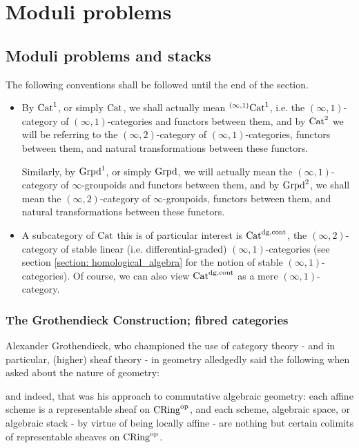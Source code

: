 \chapter{Moduli problems}
    \begin{abstract}
        
    \end{abstract}
    
    \minitoc
    
    \section{Moduli problems and stacks} \label{section: moduli_problems}
        The following conventions shall be followed until the end of the section.
        \begin{convention}
            \noindent
            \begin{itemize}
                \item By $\mathrm{Cat}^1$, or simply $\mathrm{Cat}$, we shall actually mean ${}^{(\infty, 1)}\mathrm{Cat}^1$, i.e. the $(\infty, 1)$-category of $(\infty, 1)$-categories and functors between them, and by $\mathrm{Cat}^2$ we will be referring to the $(\infty, 2)$-category of $(\infty, 1)$-categories, functors between them, and natural transformations between these functors. 
                
                Similarly, by $\mathrm{Grpd}^1$, or simply $\mathrm{Grpd}$, we will actually mean the $(\infty, 1)$-category of $\infty$-groupoids and functors between them, and by $\mathrm{Grpd}^2$, we shall mean the $(\infty, 2)$-category of $\infty$-groupoids, functors between them, and natural transformations between these functors.
                \item A subcategory of $\mathrm{Cat}$ this is of particular interest is $\mathrm{Cat}^{\mathrm{dg}, \mathrm{cont}}$, the $(\infty, 2)$-category of stable linear (i.e. differential-graded) $(\infty, 1)$-categories (see section \ref{section: homological_algebra} for the notion of stable $(\infty, 1)$-categories). Of course, we can also view $\mathrm{Cat}^{\mathrm{dg}, \mathrm{cont}}$ as a mere $(\infty, 1)$-category.
            \end{itemize} 
        \end{convention}
    
        \subsection{The Grothendieck Construction; fibred categories}
            Alexander Grothendieck, who championed the use of category theory - and in particular, (higher) sheaf theory - in geometry alledgedly said the following when asked about the nature of geometry:
                \begin{center}
                \end{center}
            and indeed, that was his approach to commutative algebraic geometry: each affine scheme is a representable sheaf on $\mathrm{CRing}^{\mathrm{op}}$, and each scheme, algebraic space, or algebraic stack - by virtue of being locally affine - are nothing but certain colimits of representable sheaves on $\mathrm{CRing}^{\mathrm{op}}$. 
            
